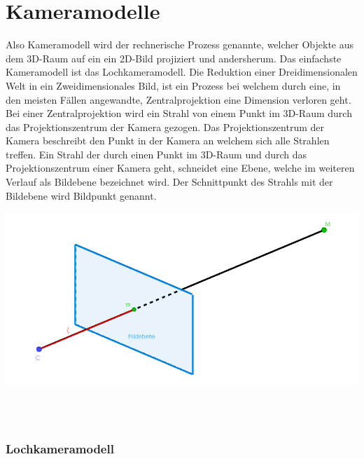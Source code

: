 \chapter{Kameramodelle}
\label{sec:CameraModels}



Also Kameramodell wird der rechnerische Prozess genannte, welcher Objekte aus dem 3D-Raum auf ein ein 2D-Bild projiziert und andersherum\cite{CamerModels.,HZ}. Das einfachste Kameramodell ist das Lochkameramodell. Die Reduktion einer Dreidimensionalen Welt in ein Zweidimensionales Bild, ist ein Prozess bei welchem durch eine, in den meisten Fällen angewandte, Zentralprojektion eine Dimension verloren geht\cite{HZ}. Bei einer Zentralprojektion wird ein Strahl von einem Punkt im 3D-Raum durch das Projektionszentrum der Kamera gezogen. Das Projektionszentrum der Kamera beschreibt den Punkt in der Kamera an welchem sich alle Strahlen treffen. Ein Strahl der durch einen Punkt im 3D-Raum und durch das Projektionszentrum einer Kamera geht, schneidet eine Ebene, welche im weiteren Verlauf als Bildebene bezeichnet wird. Der Schnittpunkt des Strahls mit der Bildebene wird Bildpunkt genannt\cite{CamerModels.,HZ}.\\

	\begin{minipage}{\linewidth}
	\centering
	\includegraphics[width=.8\linewidth]{images/Zentralprojektion.png}
	\label{fig:Zentralprojektion}
\end{minipage}\\ \\

\subsection{Lochkameramodell}

